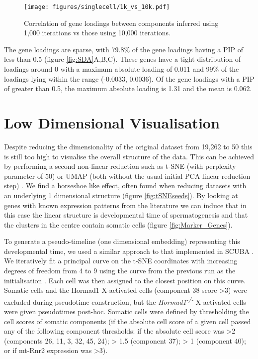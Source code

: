 \begin{figure}[H]
	\centering
	\texttt{[image: figures/singlecell/1k\_vs\_10k.pdf]}
	\caption[10k vs 1k SDA Iterations]{Correlation of gene loadings between components inferred using 1,000 iterations vs those using 10,000 iterations.}
	\label{fig:10k}
\end{figure}

The gene loadings are sparse, with 79.8\% of the gene loadings having a PIP of less than 0.5 (figure \ref{fig:SDA}A,B,C). These genes have a tight distribution of loadings around 0 with a maximum absolute loading of 0.011 and 99\% of the loadings lying within the range (-0.0033, 0.0036). Of the gene loadings with a PIP of greater than 0.5, the maximum absolute loading is 1.31 and the mean is 0.062.

\section{Low Dimensional Visualisation}

Despite reducing the dimensionality of the original dataset from 19,262 to 50 this is still too high to visualise the overall structure of the data. This can be achieved by performing a second non-linear reduction such as t-SNE (with perplexity parameter of 50) or UMAP (both without the usual initial PCA linear reduction step) \parencite{Maaten2008Visualizing, McInnes2018UMAPa, Becht2018Dimensionality}. We find a horseshoe like effect, often found when reducing datasets with an underlying 1 dimensional structure \parencite{Novembre2008Interpreting, Podani2002RESEMBLANCE} (figure \ref{fig:tSNEseeds}). By looking at genes with known expression patterns from the literature we can induce that in this case the linear structure is developmental time of spermatogenesis and that the clusters in the centre contain somatic cells (figure \ref{fig:Marker_Genes}).

To generate a pseudo-timeline (one dimensional embedding) representing this developmental time, we used a similar approach to that implemented in SCUBA \parencite{Marco2014Bifurcation}. We iteratively fit a principal curve on the t-SNE coordinates with increasing degrees of freedom from 4 to 9 using the curve from the previous run as the initialisation \parencite{Hastie1989Principal}. Each cell was then assigned to the closest position on this curve. Somatic cells and the Hormad1 X-activated cells (component 38 score >3) were excluded during pseudotime construction, but the \textit{Hormad1\textsuperscript{-/-}} X-activated cells were given pseudotimes post-hoc. Somatic cells were defined by thresholding the cell scores of somatic components (if the absolute cell score of a given cell passed any of the following component thresholds: if the absolute cell score was >2 (components 26, 11, 3, 32, 45, 24); > 1.5 (component 37); > 1 (component 40); or if mt-Rnr2 expression was >3).

